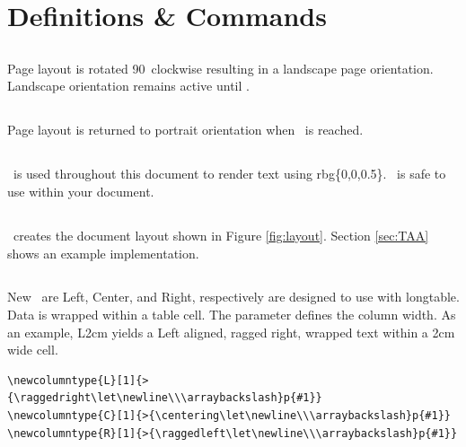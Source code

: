 \documentclass[12pt]{tlc-article}
\begin{document}
\clearpage
\section{Definitions \& Commands}
\subsection{\tlcBL}
Page layout is rotated 90\textdegree\ clockwise resulting in a landscape page
orientation.  Landscape orientation remains active until \tlcEL.

\subsection{\tlcEL}
Page layout is returned to portrait orientation when \tlcEL\ is reached.

\subsection{\tlcDB}
\tlcDB\ is used throughout this document to render text using rbg\{0,0,0.5\}.
\tlcDB\ is safe to use within your document.

\subsection{\tlcTOC}
\tlcTOC\ creates the document layout shown in Figure \ref{fig:layout}.  Section
\ref{sec:TAA} shows an example implementation.

\subsection{\tlcNCT}
New \tlcNCT\ are Left, Center, and Right, respectively are
designed to use with longtable.  Data is wrapped within a table cell.   The
parameter defines the column width.  As an example, L{2cm} yields a Left
aligned, ragged right, wrapped text within a 2cm wide cell.

\begin{lstlisting}[basicstyle=\tiny]
\newcolumntype{L}[1]{>{\raggedright\let\newline\\\arraybackslash}p{#1}}
\newcolumntype{C}[1]{>{\centering\let\newline\\\arraybackslash}p{#1}}
\newcolumntype{R}[1]{>{\raggedleft\let\newline\\\arraybackslash}p{#1}}
\end{lstlisting}
\end{document}

